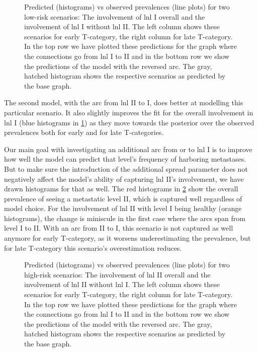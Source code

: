 \documentclass[\relativeRoot/main.tex]{subfiles}
\begin{document}
\begin{figure}
    \centering
    \def\svgwidth{1.0\textwidth}
    
    \caption[
        Comparison of prevalences of low-risk scenarios for the two directions of the arc between LNL I and II
    ]{
        Predicted (histograms) vs observed prevalences (line plots) for two low-risk scenarios: The involvement of \gls{lnl} I overall and the involvement of \gls{lnl} I without \gls{lnl} II. The left column shows these scenarios for early T-category, the right column for late T-category. In the top row we have plotted these predictions for the graph where the connections go from \gls{lnl} I to II and in the bottom row we show the predictions of the model with the reversed arc. The gray, hatched histogram shows the respective scenarios as predicted by the base graph.
    }
    \label{fig:graph:extended:low12or21}
\end{figure}

The second model, with the arc from \gls{lnl} II to I, does better at modelling this particular scenario. It also slightly improves the fit for the overall involvement in \gls{lnl} I (blue histograms in \cref{fig:graph:extended:low12or21}) as they move towards the posterior over the observed prevalences both for early and for late T-categories.

Our main goal with investigating an additional arc from or to \gls{lnl} I is to improve how well the model can predict that level's frequency of harboring metastases. But to make sure the introduction of the additional spread parameter does not negatively affect the model's ability of capturing \gls{lnl} II's involvement, we have drawn histograms for that as well. The red histograms in \cref{fig:graph:extended:high12or21} show the overall prevalence of seeing a metastatic level II, which is captured well regardless of model choice. For the involvement of \gls{lnl} II with level I being healthy (orange histograms), the change is miniscule in the first case where the arcs span from level I to II. With an arc from II to I, this scenario is not captured as well anymore for early T-category, as it worsens underestimating the prevalence, but for late T-category this scenario's overestimation reduces.

\begin{figure}
    \centering
    \def\svgwidth{1.0\textwidth}
    
    \caption[
        Comparison of prevalences of high-risk scenarios for the two directions of the arc between LNL I and II
    ]{
        Predicted (histograms) vs observed prevalences (line plots) for two high-risk scenarios: The involvement of \gls{lnl} II overall and the involvement of \gls{lnl} II without \gls{lnl} I. The left column shows these scenarios for early T-category, the right column for late T-category. In the top row we have plotted these predictions for the graph where the connections go from \gls{lnl} I to II and in the bottom row we show the predictions of the model with the reversed arc. The gray, hatched histogram shows the respective scenarios as predicted by the base graph.
    }
    \label{fig:graph:extended:high12or21}
\end{figure}
\end{document}
